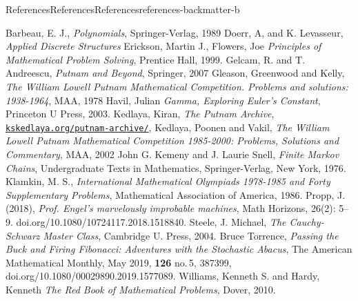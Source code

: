 \documentclass[oneside,10pt,]{book}
\numberwithin{equation}{section}
\begin{document}
\begin{references-chapter-numberless}{References}{References}{}{References}{}{}{references-backmatter-b}
\begin{referencelist}
\hypertarget{biblio-biblio-barbeau-1989}{}Barbeau, E. J., \textit{Polynomials}, Springer-Verlag, 1989
\hypertarget{biblio-biblio-doerr-2019}{}Doerr, A, and K. Levasseur, \textit{Applied Discrete Structures}
\hypertarget{biblio-biblio-allenby-1983}{}Erickson, Martin J., Flowers, Joe \textit{Principles of Mathematical Problem Solving}, Prentice Hall, 1999.
\hypertarget{biblio-biblio-titu-2007}{}Gelcam, R. and  T. Andreescu, \textit{Putnam and Beyond}, Springer, 2007
\hypertarget{biblio-biblio-putnam-1}{}Gleason, Greenwood and Kelly, \textit{The William Lowell Putnam Mathematical Competition. Problems and solutions: 1938-1964}, MAA, 1978
\hypertarget{biblio-biblio-havil-2003}{}Havil, Julian \textit{Gamma, Exploring Euler's Constant}, Princeton U Press, 2003.
\hypertarget{biblio-biblio-putnam-archive}{}Kedlaya, Kiran, \textit{The Putnam Archive}, \href{https://kskedlaya.org/putnam-archive/}{\nolinkurl{kskedlaya.org/putnam-archive/}},
\hypertarget{biblio-biblio-putnam-3}{}Kedlaya, Poonen and Vakil, \textit{The William Lowell Putnam Mathematical Competition 1985-2000: Problems, Solutions and Commentary}, MAA, 2002
\hypertarget{biblio-biblio-kemeny}{}John G. Kemeny and J. Laurie Snell, \textit{Finite Markov Chains}, Undergraduate Texts in Mathematics, Springer-Verlag, New York, 1976.
\hypertarget{biblio-biblio-klamkin-1986}{}Klamkin, M. S., \textit{International Mathematical Olympiads 1978-1985 and Forty Supplementary Problems}, Mathematical Association of America, 1986.
\hypertarget{biblio-biblio-propp}{}Propp, J. (2018), \textit{Prof.  Engel’s  marvelously  improbable  machines}, Math Horizons, 26(2):  5–9. doi.org\slash{}10.1080\slash{}10724117.2018.1518840.
\hypertarget{biblio-biblio-steele-2004}{}Steele, J. Michael, \textit{The Cauchy-Schwarz Master Class}, Cambridge U. Press, 2004.
\hypertarget{biblio-biblio-torrence}{}Bruce Torrence, \textit{Passing the Buck and Firing Fibonacci: Adventures with the Stochastic Abacus}, The American Mathematical Monthly, May 2019, \textbf{126} no.\@\,5, 387\textendash{}399, doi.org\slash{}10.1080\slash{}00029890.2019.1577089.
\hypertarget{biblio-biblio-williams-2010}{}Williams, Kenneth S. and  Hardy, Kenneth \textit{The Red Book of Mathematical Problems}, Dover, 2010.
\end{referencelist}
\end{references-chapter-numberless}
\end{document}
